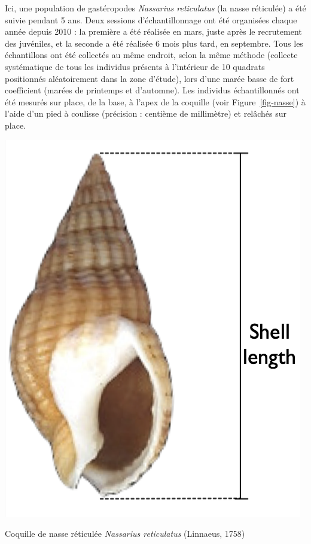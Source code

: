 \documentclass[
  a4paper,
  DIV=11,
  numbers=noendperiod,
  oneside]{scrreprt}
\begin{document}
Ici, une population de gastéropodes \emph{Nassarius reticulatus} (la
nasse réticulée) a été suivie pendant 5 ans. Deux sessions
d'échantillonnage ont été organisées chaque année depuis 2010 : la
première a été réalisée en mars, juste après le recrutement des
juvéniles, et la seconde a été réalisée 6 mois plus tard, en septembre.
Tous les échantillons ont été collectés au même endroit, selon la même
méthode (collecte systématique de tous les individus présents à
l'intérieur de 10 quadrats positionnés aléatoirement dans la zone
d'étude), lors d'une marée basse de fort coefficient (marées de
printemps et d'automne). Les individus échantillonnés ont été mesurés
sur place, de la base, à l'apex de la coquille (voir
Figure~\ref{fig-nasse}) à l'aide d'un pied à coulisse (précision :
centième de millimètre) et relâchés sur place.

\begin{marginfigure}

{\centering \includegraphics{images/Nassarius.png}

}

\caption{\label{fig-nasse}Coquille de nasse réticulée \emph{Nassarius
reticulatus} (Linnaeus, 1758)}

\end{marginfigure}
\end{document}
